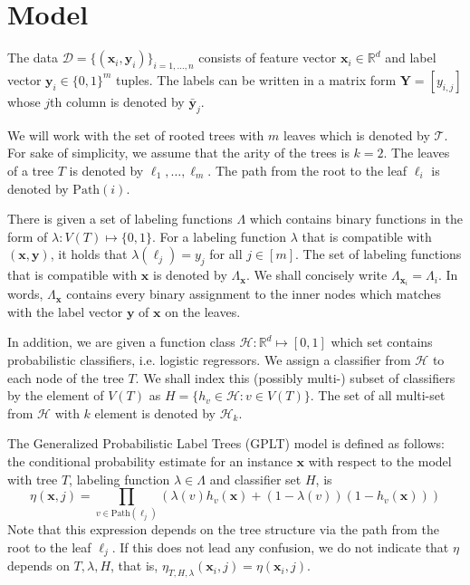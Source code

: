 \documentclass{article}
\newcommand{\R}{\mathbb{R}}
\newcommand{\cD}{\mathcal{D}}
\newcommand{\cH}{\mathcal{H}}
\newcommand{\cT}{\mathcal{T}}
\newcommand{\path}{\text{Path}}
\renewcommand{\vec}[1]{\mathbf{#1}}
\newcommand{\bx}{\mathbf{x}}
\newcommand{\by}{\vec{y}}
\newcommand{\bY}{\vec{Y}}
\begin{document}
\section{Model}

The data $\cD = \{ (\bx_{i},\by_{i})\}_{i=1,\dots,n}$ consists of feature vector $\bx_i \in \R^d$ and label vector $\by_i\in \{ 0,1\}^m$ tuples. The labels can be written in a matrix form $\bY = [y_{i,j}]$ whose $j$\/th column is denoted by $\bar{\by}_{j}$.

We will work with the set of rooted trees with $m$ leaves which is denoted by $\cT$. For sake of simplicity, we assume that the arity of the trees is $k=2$. The leaves of a tree $T$ is denoted by $\ell_1, \dots , \ell_m$. The path from the root to the leaf $\ell_i$ is denoted by $\path (i )$. 

There is given a set of labeling functions $\Lambda$ which contains binary functions in the form of $\lambda: V(T) \mapsto \{0,1\}$. For a labeling function $\lambda$ that is compatible with $(\bx,\by)$, it holds that $\lambda(\ell_j) = y_{j}$ for all $j\in [m]$. The set of labeling functions that is compatible with $\bx$ is denoted by $\Lambda_{\bx}$. We shall concisely write 
$\Lambda_{\bx_i} = \Lambda_{i}$. In words, $\Lambda_{\bx}$ contains every binary assignment to the inner nodes which matches with the label vector $\by$ of $\bx$ on the leaves.

In addition, we are given a function class $\cH : \R^d \mapsto [0,1]$ which set contains probabilistic classifiers, i.e. logistic regressors. We assign a classifier from $\cH$ to each node of the tree $T$. We shall index this (possibly multi-) subset of classifiers by the element of $V(T)$ as $H = \{ h_{v} \in \cH : v\in V(T) \}$. The set of all multi-set from $\cH$ with $k$ element is denoted by  $\cH_k$.

The Generalized Probabilistic Label Trees (GPLT) model is defined as follows: the conditional probability estimate for an instance $\bx$ with respect to the model with tree $T$, labeling function $\lambda \in \Lambda$ and classifier set $H$,  is
\[
\eta( \bx, j ) = \prod_{v \in \path(\ell_j)} \left( \lambda(v) h_v (\bx) + (1-\lambda(v) ) (1-h_v (\bx)) \right)
\]
Note that this expression depends on the tree structure via the path from the root to the leaf $\ell_j$. If this does not lead any confusion, we do not indicate that $\eta$ depends on $T,\lambda,H$, that is, $\eta_{T,H,\lambda}( \bx_i, j ) = \eta( \bx_i, j ) $.
\end{document}
